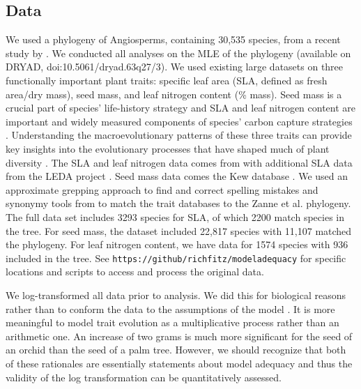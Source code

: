 \subsection{Data}
We used a phylogeny of Angiosperms, containing 30,535 species, from a recent study by \citet{Zanne2013}.  We conducted all analyses on the MLE of the phylogeny (available on DRYAD, doi:10.5061/dryad.63q27/3). We used existing large datasets on three functionally important plant traits: specific leaf area (SLA, defined as fresh area/dry mass), seed mass, and leaf nitrogen content (\% mass). Seed mass is a crucial part of species' life-history strategy \citep{Leishman2000, Westoby2002} and SLA and leaf nitrogen content are important and widely measured components of species' carbon capture strategies \citep{Wright2004}. Understanding the macroevolutionary patterns of these three traits can provide key insights into the evolutionary processes that have shaped much of plant diversity \citep{ksi}. The SLA and leaf nitrogen data comes from \citet{Wright2004} with additional SLA data from the LEDA project \citep{Kleyer2008}. Seed mass data comes the Kew database \citep{Kew2008}. We used an approximate grepping approach to find and correct spelling mistakes and synonymy tools from \citet{theplantlist} to match the trait databases to the Zanne et al. phylogeny. 
The full data set includes 3293 species for SLA, of which 2200 match species in the \citet{Zanne2013} tree. For seed mass, the dataset included 22,817 species with 11,107 matched the phylogeny. For leaf nitrogen content, we have data for 1574 species with 936 included in the tree. 
%
See \texttt{https://github/richfitz/modeladequacy} for specific locations and scripts to access and process the original data. 

We log-transformed all data prior to analysis. We did this for biological reasons rather than to conform the data to the assumptions of the model \citep{Houle2011}. It is more meaningful to model trait evolution as a multiplicative process rather than an arithmetic one. An increase of two grams is much more significant for the seed of an orchid than the seed of a palm tree. However, we should recognize that both of these rationales are essentially statements about model adequacy and thus the validity of the log transformation can be quantitatively assessed.

